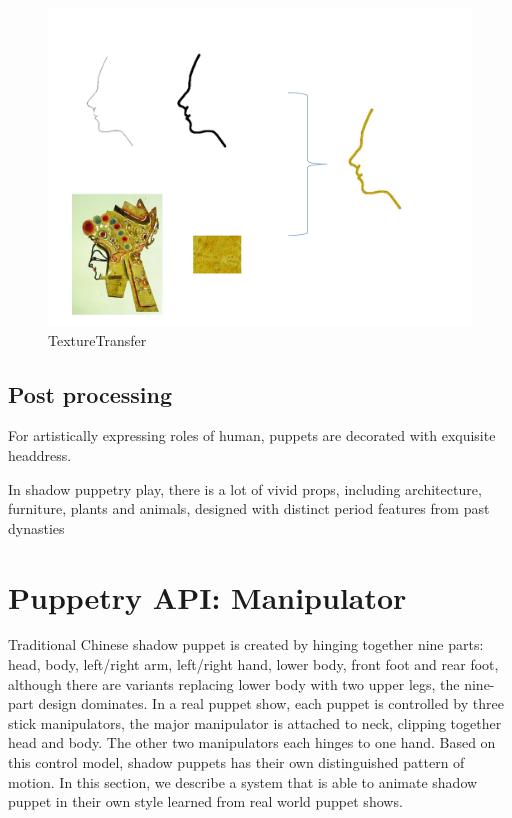 \documentclass[letter]{sig-alternate}
\begin{document}
\begin{figure}[t]
\begin{center}
\includegraphics[scale=0.3]{figure/TextureTransfer.pdf}
\caption{\small{TextureTransfer}}
\label{fig:firstfig}
\end{center}
\end{figure}
    

\subsection{Post processing}
For artistically expressing roles of human, puppets are decorated with exquisite headdress. 

In shadow puppetry play, there is a lot of vivid props, including architecture, furniture, plants and animals, designed with distinct period features from past dynasties

\section{Puppetry API:  Manipulator}


Traditional Chinese shadow puppet is created by hinging together nine parts: head, body, left/right arm, left/right hand, lower body, front foot and rear foot, although there are variants replacing lower body with two upper legs, the nine-part design dominates. In a real puppet show, each puppet is controlled by three stick manipulators, the major manipulator is attached to neck, clipping together head and body. The other two manipulators each hinges to one hand. Based on this control model, shadow puppets has their own distinguished pattern of motion. In this section, we describe a system that is able to animate shadow puppet in their own style learned from real world puppet shows.
\end{document}
